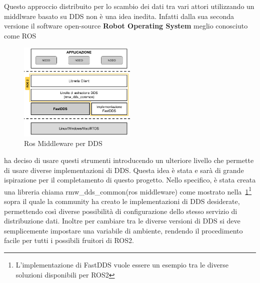 Questo approccio distribuito per lo scambio dei dati tra vari attori utilizzando un middlware basato su DDS non è una idea inedita. Infatti dalla sua seconda versione il software open-source \textbf{Robot Operating System}\cite{ros2iron} meglio conosciuto come ROS
\begin{figure}
  \includegraphics[width=0.5\textwidth]{img/ROS_MW.png}
  \caption{Ros Middleware per DDS} 
  \label{fig:rmw_dds_common}
\end{figure}
ha deciso di usare questi strumenti introducendo un ulteriore livello che permette di usare diverse implementazioni di DDS. Questa idea è stata e sarà di grande ispirazione per il completamento di questo progetto.
Nello specifico, è stata creata una libreria chiama rmw\_dds\_common(ros middleware) come mostrato nella~\ref{fig:rmw_dds_common}\footnote{L'implementazione di FastDDS vuole essere un esempio tra le diverse soluzioni disponibili per ROS2} sopra il quale la community ha creato le implementazioni di DDS desiderate, permettendo così diverse possibilità di configurazione dello stesso servizio di distribuzione dati.
Inoltre per cambiare tra le diverse versioni di DDS si deve semplicemente impostare una variabile di ambiente, rendendo il procedimento facile per tutti i possibili fruitori di ROS2. 

